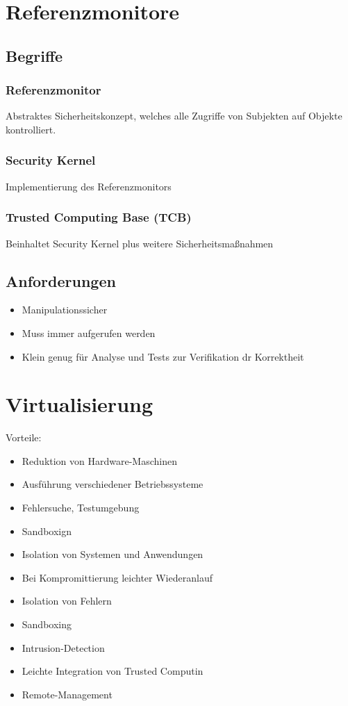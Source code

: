 \section{Referenzmonitore}
\subsection{Begriffe}
\subsubsection{Referenzmonitor}
Abstraktes Sicherheitskonzept, welches alle Zugriffe von Subjekten auf Objekte kontrolliert.

\subsubsection{Security Kernel}
Implementierung des Referenzmonitors

\subsubsection{Trusted Computing Base (TCB)}
Beinhaltet Security Kernel plus weitere Sicherheitsmaßnahmen

\subsection{Anforderungen}
\begin{itemize}
    \item Manipulationssicher
    \item Muss immer aufgerufen werden
    \item Klein genug für Analyse und Tests zur Verifikation dr Korrektheit
\end{itemize}

\section{Virtualisierung}
Vorteile:
\begin{itemize}
    \item Reduktion von Hardware-Maschinen
    \item Ausführung verschiedener Betriebssysteme
    \item Fehlersuche, Testumgebung
    \item Sandboxign
    \item Isolation von Systemen und Anwendungen
    \item Bei Kompromittierung leichter Wiederanlauf
    \item Isolation von Fehlern
    \item Sandboxing
    \item Intrusion-Detection
    \item Leichte Integration von Trusted Computin
    \item Remote-Management
\end{itemize}

